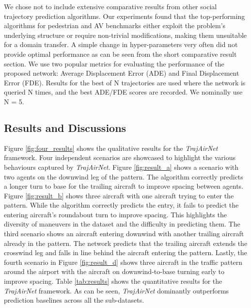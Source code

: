 \documentclass[letterpaper, 10 pt, conference]{ieeeconf}
\begin{document}
We chose not to include extensive comparative results from other social trajectory prediction algorithms. Our experiments found that the top-performing algorithms for pedestrian and AV benchmarks either exploit the problem's underlying structure or require non-trivial modifications, making them unsuitable for a domain transfer. A simple change in hyper-parameters very often did not provide optimal performance as can be seen from the short comparative result section. We use two popular metrics \cite{zhao2020noticing} for evaluating the performance of the proposed network: Average Displacement Error (ADE) and Final Displacement Error (FDE).
Results for the best of N trajectories are used where the network is queried N times, and the best ADE/FDE scores are recorded. We nominally use N = 5.
\subsection{Results and Discussions}

Figure \ref{fig:four_results} shows the qualitative results for the \textit{TrajAirNet}  framework. Four independent scenarios are showcased to highlight the various behaviours captured by \textit{TrajAirNet}. Figure \ref{fig:result_a} shows a scenario with two agents on the downwind leg of the pattern. The algorithm correctly predicts a longer turn to base for the trailing aircraft to improve spacing between agents. Figure \ref{fig:result_b} shows three aircraft with one aircraft trying to enter the pattern. While the algorithm correctly predicts the entry, it fails to predict the entering aircraft's roundabout turn to improve spacing. This highlights the diversity of maneuvers in the dataset and the difficulty in predicting them. The third scenario shows an aircraft entering downwind with another trailing aircraft already in the pattern. The network predicts that the trailing aircraft extends the crosswind leg and falls in line behind the aircraft entering the pattern. Lastly, the fourth scenario in Figure \ref{fig:result_d} shows three aircraft in the traffic pattern around the airport with the aircraft on downwind-to-base turning early to improve spacing. Table \ref{tab:results} shows the quantitative results for the \textit{TrajAirNet}  framework. As can be seen, \textit{TrajAirNet}  dominantly outperforms prediction baselines across all the sub-datasets.   
\end{document}
